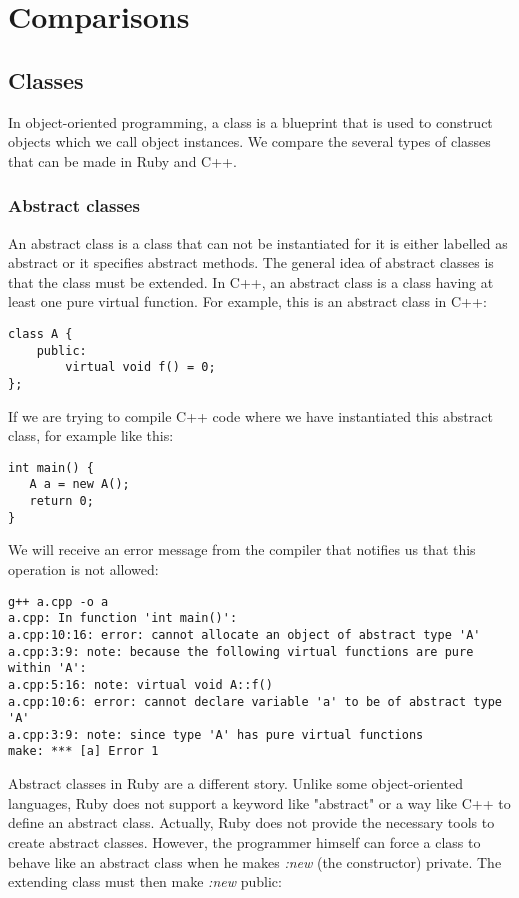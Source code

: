 \documentclass[10pt,a4paper,twocolumn]{article}
\begin{document}
\section{Comparisons}

\subsection{Classes}
In object-oriented programming, a class is a blueprint that is used to construct objects which we call object instances. We compare the several types of classes that can be made in Ruby and C++.

\subsubsection{Abstract classes}
An abstract class is a class that can not be instantiated for it is either labelled as abstract or it specifies abstract methods. The general idea of abstract classes is that the class must be extended. In C++, an abstract class is a class having at least one pure virtual function. For example, this is an abstract class in C++:

\begin{lstlisting}
class A {
	public:
		virtual void f() = 0;
};
\end{lstlisting}

If we are trying to compile C++ code where we have instantiated this abstract class, for example like this:

\begin{lstlisting}
int main() {
   A a = new A();
   return 0;
}
\end{lstlisting}

We will receive an error message from the compiler that notifies us that this operation is not allowed:

\begin{lstlisting}
g++ a.cpp -o a
a.cpp: In function 'int main()':
a.cpp:10:16: error: cannot allocate an object of abstract type 'A'
a.cpp:3:9: note: because the following virtual functions are pure within 'A':
a.cpp:5:16: note: virtual void A::f()
a.cpp:10:6: error: cannot declare variable 'a' to be of abstract type 'A'
a.cpp:3:9: note: since type 'A' has pure virtual functions
make: *** [a] Error 1
\end{lstlisting}

Abstract classes in Ruby are a different story. Unlike some object-oriented languages, Ruby does not support a keyword like "abstract" or a way like C++ to define an abstract class. Actually, Ruby does not provide the necessary tools to create abstract classes. However, the programmer himself can force a class to behave like an abstract class when he makes \textit{:new} (the constructor) private. The extending class must then make \textit{:new} public:
\end{document}
